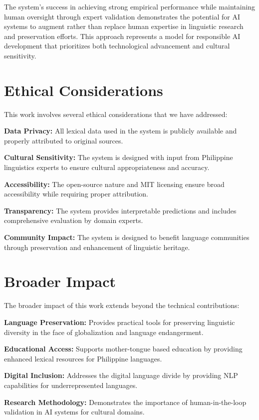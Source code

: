 \documentclass[11pt]{article}
\begin{document}
The system's success in achieving strong empirical performance while maintaining human oversight through expert validation demonstrates the potential for AI systems to augment rather than replace human expertise in linguistic research and preservation efforts. This approach represents a model for responsible AI development that prioritizes both technological advancement and cultural sensitivity.

\section*{Ethical Considerations}

This work involves several ethical considerations that we have addressed:

\textbf{Data Privacy:} All lexical data used in the system is publicly available and properly attributed to original sources.

\textbf{Cultural Sensitivity:} The system is designed with input from Philippine linguistics experts to ensure cultural appropriateness and accuracy.

\textbf{Accessibility:} The open-source nature and MIT licensing ensure broad accessibility while requiring proper attribution.

\textbf{Transparency:} The system provides interpretable predictions and includes comprehensive evaluation by domain experts.

\textbf{Community Impact:} The system is designed to benefit language communities through preservation and enhancement of linguistic heritage.

\section*{Broader Impact}

The broader impact of this work extends beyond the technical contributions:

\textbf{Language Preservation:} Provides practical tools for preserving linguistic diversity in the face of globalization and language endangerment.

\textbf{Educational Access:} Supports mother-tongue based education by providing enhanced lexical resources for Philippine languages.

\textbf{Digital Inclusion:} Addresses the digital language divide by providing NLP capabilities for underrepresented languages.

\textbf{Research Methodology:} Demonstrates the importance of human-in-the-loop validation in AI systems for cultural domains.
\end{document}
